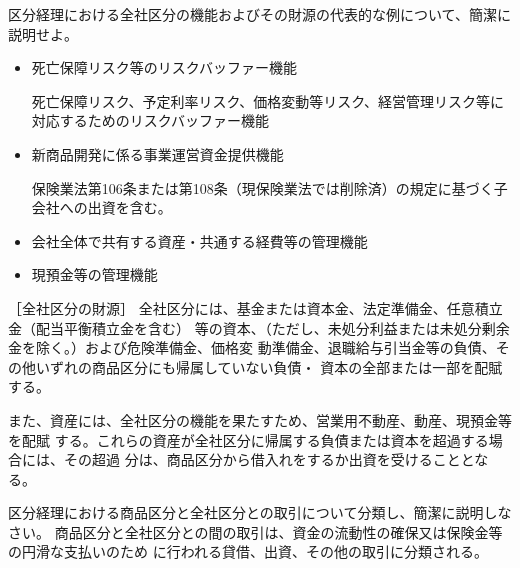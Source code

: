 \documentclass[report,gutter=10mm,fore-edge=10mm,uplatex,dvipdfmx]{jlreq}
\begin{document}
区分経理における全社区分の機能およびその財源の代表的な例について、簡潔に説明せよ。
\answer{}

\begin{itemize}
\item[]  死亡保障リスク等のリスクバッファー機能\par
  死亡保障リスク、予定利率リスク、価格変動等リスク、経営管理リスク等に対応するためのリスクバッファー機能
\item[]  新商品開発に係る事業運営資金提供機能\par
  保険業法第106条または第108条（現保険業法では削除済）の規定に基づく子会社への出資を含む。
\item[]  会社全体で共有する資産・共通する経費等の管理機能
\item[]  現預金等の管理機能
\end{itemize}

［全社区分の財源］
全社区分には、基金または資本金、法定準備金、任意積立金（配当平衡積立金を含む）
等の資本、（ただし、未処分利益または未処分剰余金を除く。）および危険準備金、価格変
動準備金、退職給与引当金等の負債、その他いずれの商品区分にも帰属していない負債・
資本の全部または一部を配賦する。

また、資産には、全社区分の機能を果たすため、営業用不動産、動産、現預金等を配賦
する。これらの資産が全社区分に帰属する負債または資本を超過する場合には、その超過
分は、商品区分から借入れをするか出資を受けることとなる。

区分経理における商品区分と全社区分との取引について分類し、簡潔に説明しなさい。
\answer{}
商品区分と全社区分との間の取引は、資金の流動性の確保又は保険金等の円滑な支払いのため
に行われる貸借、出資、その他の取引に分類される。
\end{document}
